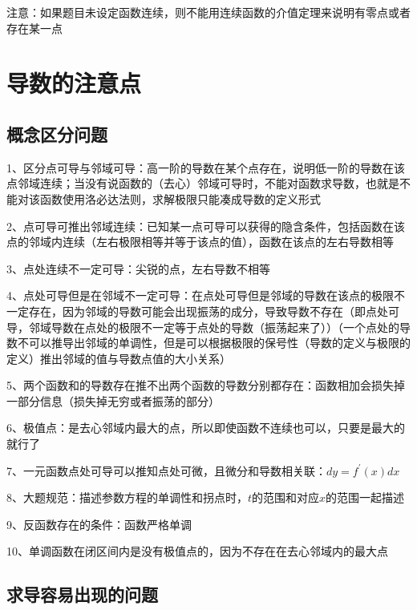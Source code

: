 注意：如果题目未设定函数连续，则不能用连续函数的介值定理来说明有零点或者存在某一点



\section{导数的注意点}



\subsection{概念区分问题}

1、区分点可导与邻域可导：高一阶的导数在某个点存在，说明低一阶的导数在该点邻域连续；当没有说函数的（去心）邻域可导时，不能对函数求导数，也就是不能对该函数使用洛必达法则，求解极限只能凑成导数的定义形式

2、点可导可推出邻域连续：已知某一点可导可以获得的隐含条件，包括函数在该点的邻域内连续（左右极限相等并等于该点的值），函数在该点的左右导数相等

3、点处连续不一定可导：尖锐的点，左右导数不相等

4、点处可导但是在邻域不一定可导：在点处可导但是邻域的导数在该点的极限不一定存在，因为邻域的导数可能会出现振荡的成分，导致导数不存在（即点处可导，邻域导数在点处的极限不一定等于点处的导数（振荡起来了））（一个点处的导数不可以推导出邻域的单调性，但是可以根据极限的保号性（导数的定义与极限的定义）推出邻域的值与导数点值的大小关系）

5、两个函数和的导数存在推不出两个函数的导数分别都存在：函数相加会损失掉一部分信息（损失掉无穷或者振荡的部分）

6、极值点：是去心邻域内最大的点，所以即使函数不连续也可以，只要是最大的就行了

7、一元函数点处可导可以推知点处可微，且微分和导数相关联：$ dy=f^{\prime}(x)dx $

8、大题规范：描述参数方程的单调性和拐点时，$ t $的范围和对应$ x $的范围一起描述

9、反函数存在的条件：函数严格单调

10、单调函数在闭区间内是没有极值点的，因为不存在在去心邻域内的最大点



\subsection{求导容易出现的问题}

